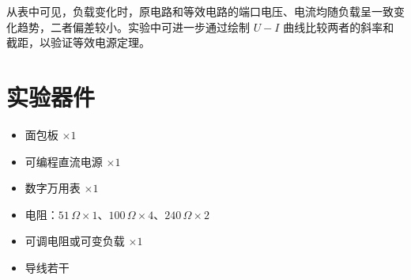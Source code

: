 \documentclass[12pt]{ctexart}
\begin{document}
从表中可见，负载变化时，原电路和等效电路的端口电压、电流均随负载呈一致变化趋势，二者偏差较小。实验中可进一步通过绘制 \(U-I\) 曲线比较两者的斜率和截距，以验证等效电源定理。

\section{实验器件}

\begin{itemize}
    \item 面包板 \(\times 1\)
    \item 可编程直流电源 \(\times 1\)
    \item 数字万用表 \(\times 1\)
    \item 电阻：\(51\,\Omega\times 1\)、\(100\,\Omega\times 4\)、\(240\,\Omega\times 2\)
    \item 可调电阻或可变负载 \(\times 1\)
    \item 导线若干
\end{itemize}
\end{document}
